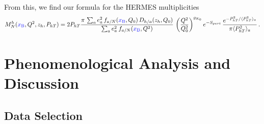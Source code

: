 \documentclass[final,3p,times,onecolumn,sort&compress,hidelinks]{elsarticle}
\newcommand{\xbj}{\ensuremath{{\cbl x_{\rm B}}}}
\newcommand\3[1]{\boldsymbol{#1}}
\newcommand{\cbl}{\color{blue}}
\begin{document}
From this, we find our formula for the HERMES multiplicities~\cite{Airapetian:2012ki} 
\begin{equation}
M_N^h(\xbj, Q^2,z_h, P_{hT}) =
2P_{hT}\frac{\pi\, \sum_{a} e_a^2 \,f_{a/N}(\xbj, Q_0)\,D_{h/a}(z_h, Q_0)}
{\sum_{a} e_a^2 \> f_{a/N} (\xbj,Q^2)} \,  \left( \frac{Q^2}{Q_0^2}\right)^{g_{K_0}}e^{-S_{pert}}\,
\frac{e^{-P_{hT}^2/\langle P_{hT}^2 \rangle_a}}{\pi\langle P_{hT}^2 \rangle_a}
\,. \label{e:mult_HERMES}
\end{equation}


\section{Phenomenological Analysis and Discussion}
\label{s:phenom}

\subsection{Data Selection}
\label{s:data}
\end{document}
